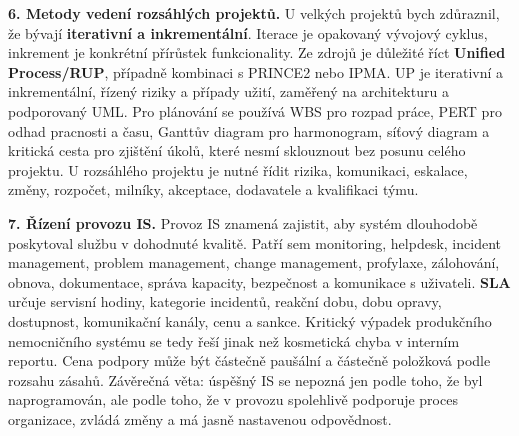 \documentclass[11pt,a4paper]{article}
\begin{document}
\begin{greenbox}
\textbf{6. Metody vedení rozsáhlých projektů.} U velkých projektů bych zdůraznil, že bývají \textbf{iterativní a inkrementální}. Iterace je opakovaný vývojový cyklus, inkrement je konkrétní přírůstek funkcionality. Ze zdrojů je důležité říct \textbf{Unified Process/RUP}, případně kombinaci s PRINCE2 nebo IPMA. UP je iterativní a inkrementální, řízený riziky a případy užití, zaměřený na architekturu a podporovaný UML. Pro plánování se používá WBS pro rozpad práce, PERT pro odhad pracnosti a času, Ganttův diagram pro harmonogram, síťový diagram a kritická cesta pro zjištění úkolů, které nesmí sklouznout bez posunu celého projektu. U rozsáhlého projektu je nutné řídit rizika, komunikaci, eskalace, změny, rozpočet, milníky, akceptace, dodavatele a kvalifikaci týmu.

\textbf{7. Řízení provozu IS.} Provoz IS znamená zajistit, aby systém dlouhodobě poskytoval službu v dohodnuté kvalitě. Patří sem monitoring, helpdesk, incident management, problem management, change management, profylaxe, zálohování, obnova, dokumentace, správa kapacity, bezpečnost a komunikace s uživateli. \textbf{SLA} určuje servisní hodiny, kategorie incidentů, reakční dobu, dobu opravy, dostupnost, komunikační kanály, cenu a sankce. Kritický výpadek produkčního nemocničního systému se tedy řeší jinak než kosmetická chyba v interním reportu. Cena podpory může být částečně paušální a částečně položková podle rozsahu zásahů. Závěrečná věta: úspěšný IS se nepozná jen podle toho, že byl naprogramován, ale podle toho, že v provozu spolehlivě podporuje proces organizace, zvládá změny a má jasně nastavenou odpovědnost.
\end{greenbox}
\end{document}
